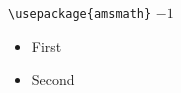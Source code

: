 \documentclass{article}
\begin{document}
\verb+\usepackage{amsmath}+
$-1$

\begin{itemize}
\item First
\item Second
\end{itemize}
\end{document}
